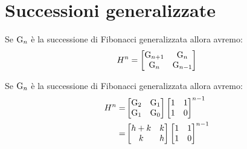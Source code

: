 \section{Successioni generalizzate}
\begin{defn}
Se $\mathrm{G}_{n}$ è la successione di Fibonacci generalizzata allora avremo:
\begin{equation}
H^n=\begin{bmatrix}
	\mathrm{G}_{n+1}&\mathrm{G}_{n}\\\mathrm{G}_{n}&\mathrm{G}_{n-1}
\end{bmatrix}
\end{equation}
\end{defn}
\begin{thm}\label{thm:Formamatricialegeneralizzata}
	Se $\mathrm{G}_{n}$ è la successione di Fibonacci generalizzata allora avremo:
	\begin{align*}
		H^n=&\begin{bmatrix}
			\mathrm{G}_{2}&\mathrm{G}_{1}\\\mathrm{G}_{1}&\mathrm{G}_{0}
		\end{bmatrix}\begin{bmatrix}
			1&1\\ 1&0\\
		\end{bmatrix}^{n-1}\\
	=&\begin{bmatrix}
		h+k&k\\k&h\\
	\end{bmatrix}\begin{bmatrix}
		1&1\\ 1&0\\
	\end{bmatrix}^{n-1}\\
	\end{align*}
\end{thm}
